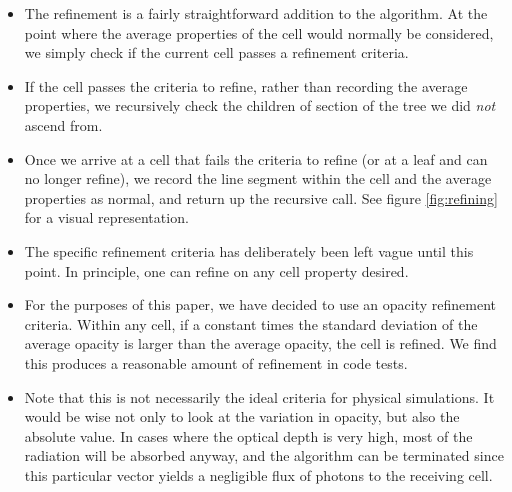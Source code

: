 \begin{itemize}
\item The refinement is a fairly straightforward addition to the algorithm. At the point where the average properties of the cell would normally be considered, we simply check if the current cell passes a refinement criteria.
\item If the cell passes the criteria to refine, rather than recording the average properties, we recursively check the children of section of the tree we did \emph{not} ascend from.
\item Once we arrive at a cell that fails the criteria to refine (or at a leaf and can no longer refine), we record the line segment within the cell and the average properties as normal, and return up the recursive call. See figure \ref{fig:refining} for a visual representation.
\item The specific refinement criteria has deliberately been left vague until this point. In principle, one can refine on any cell property desired.
\item For the purposes of this paper, we have decided to use an opacity refinement criteria. Within any cell, if a constant times the standard deviation of the average opacity is larger than the average opacity, the cell is refined. We find this produces a reasonable amount of refinement in code tests.
\item Note that this is not necessarily the ideal criteria for physical simulations. It would be wise not only to look at the variation in opacity, but also the absolute value. In cases where the optical depth is very high, most of the radiation will be absorbed anyway, and the algorithm can be terminated since this particular vector yields a negligible flux of photons to the receiving cell.
\end{itemize}

